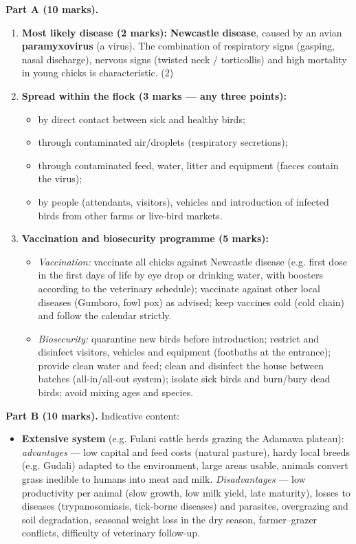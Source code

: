 \documentclass[11pt]{article}
\begin{document}
\begin{corrige}
\textbf{Part A (10 marks).}
\begin{enumerate}
\item \textbf{Most likely disease (2 marks):} \textbf{Newcastle disease}, caused by an avian \textbf{paramyxovirus} (a virus). The combination of respiratory signs (gasping, nasal discharge), nervous signs (twisted neck / torticollis) and high mortality in young chicks is characteristic. \hfill (2)
\item \textbf{Spread within the flock (3 marks — any three points):}
\begin{itemize}
\item by direct contact between sick and healthy birds;
\item through contaminated air/droplets (respiratory secretions);
\item through contaminated feed, water, litter and equipment (faeces contain the virus);
\item by people (attendants, visitors), vehicles and introduction of infected birds from other farms or live-bird markets.
\end{itemize}
\item \textbf{Vaccination and biosecurity programme (5 marks):}
\begin{itemize}
\item \emph{Vaccination:} vaccinate all chicks against Newcastle disease (e.g. first dose in the first days of life by eye drop or drinking water, with boosters according to the veterinary schedule); vaccinate against other local diseases (Gumboro, fowl pox) as advised; keep vaccines cold (cold chain) and follow the calendar strictly.
\item \emph{Biosecurity:} quarantine new birds before introduction; restrict and disinfect visitors, vehicles and equipment (footbaths at the entrance); provide clean water and feed; clean and disinfect the house between batches (all-in/all-out system); isolate sick birds and burn/bury dead birds; avoid mixing ages and species.
\end{itemize}
\end{enumerate}
\textbf{Part B (10 marks).} Indicative content:
\begin{itemize}
\item \textbf{Extensive system} (e.g. Fulani cattle herds grazing the Adamawa plateau): \emph{advantages} — low capital and feed costs (natural pasture), hardy local breeds (e.g. Gudali) adapted to the environment, large areas usable, animals convert grass inedible to humans into meat and milk. \emph{Disadvantages} — low productivity per animal (slow growth, low milk yield, late maturity), losses to diseases (trypanosomiasis, tick-borne diseases) and parasites, overgrazing and soil degradation, seasonal weight loss in the dry season, farmer--grazer conflicts, difficulty of veterinary follow-up.

\end{itemize}
\end{corrige}
\end{document}
